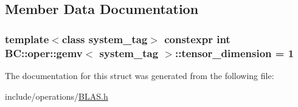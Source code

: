 \subsection{Member Data Documentation}
\subsubsection[{\texorpdfstring{tensor\+\_\+dimension}{tensor_dimension}}]{\setlength{\rightskip}{0pt plus 5cm}template$<$class system\+\_\+tag$>$ constexpr int {\bf B\+C\+::oper\+::gemv}$<$ system\+\_\+tag $>$\+::tensor\+\_\+dimension = 1\hspace{0.3cm}{\ttfamily [static]}}\hypertarget{structBC_1_1oper_1_1gemv_a7d2defce6bbc1855c0557985a6804991}{}\label{structBC_1_1oper_1_1gemv_a7d2defce6bbc1855c0557985a6804991}


The documentation for this struct was generated from the following file\+:\begin{DoxyCompactItemize}
\item 
include/operations/\hyperlink{operations_2BLAS_8h}{B\+L\+A\+S.\+h}\end{DoxyCompactItemize}
